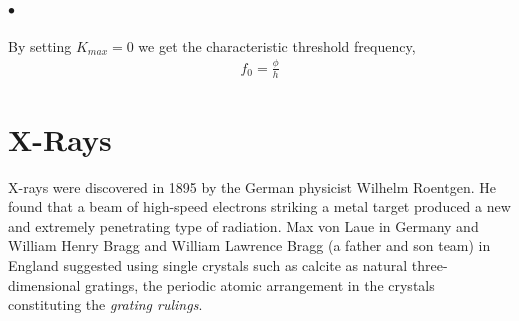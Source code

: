     \paragraph{$\bullet$} By setting $K_{max}=0$ we get the characteristic threshold frequency,
    \begin{align}
        \label{eq:threshold frequency}
        f_0 = \frac{\phi}{h}
    \end{align}

\section{X-Rays}
    X-rays were discovered in 1895 by the German physicist Wilhelm Roentgen. 
    He found that a beam of high-speed electrons striking a metal target produced a new and extremely penetrating type of radiation.
    Max von Laue in Germany and William Henry Bragg and William Lawrence Bragg (a father and son team) in 
    England suggested using single crystals such as calcite as natural three-dimensional gratings, the 
    periodic atomic arrangement in the crystals constituting the \textit{grating rulings}.


